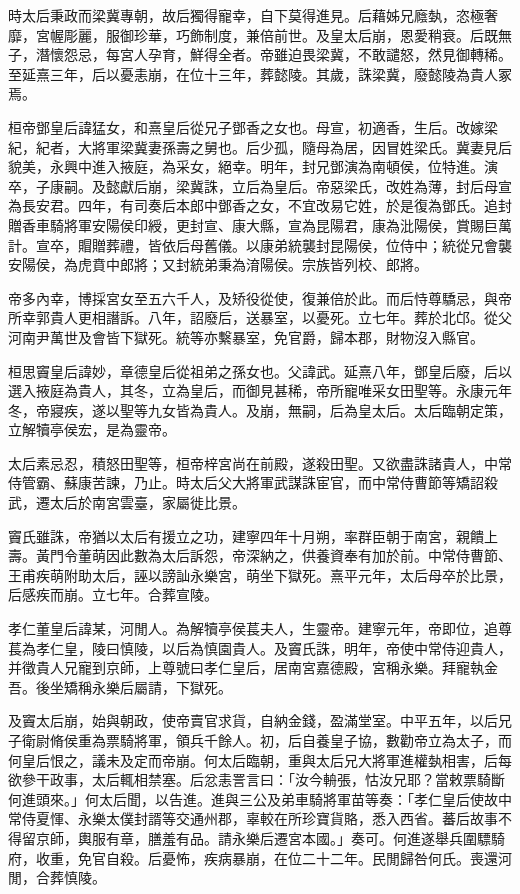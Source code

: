 \begin{pinyinscope}
時太后秉政而梁冀專朝，故后獨得寵幸，自下莫得進見。后藉姊兄廕埶，恣極奢靡，宮幄彫麗，服御珍華，巧飾制度，兼倍前世。及皇太后崩，恩愛稍衰。后既無子，潛懷怨忌，每宮人孕育，鮮得全者。帝雖迫畏梁冀，不敢譴怒，然見御轉稀。至延熹三年，后以憂恚崩，在位十三年，葬懿陵。其歲，誅梁冀，廢懿陵為貴人冢焉。

桓帝鄧皇后諱猛女，和熹皇后從兄子鄧香之女也。母宣，初適香，生后。改嫁梁紀，紀者，大將軍梁冀妻孫壽之舅也。后少孤，隨母為居，因冒姓梁氏。冀妻見后貌美，永興中進入掖庭，為采女，絕幸。明年，封兄鄧演為南頓侯，位特進。演卒，子康嗣。及懿獻后崩，梁冀誅，立后為皇后。帝惡梁氏，改姓為薄，封后母宣為長安君。四年，有司奏后本郎中鄧香之女，不宜改易它姓，於是復為鄧氏。追封贈香車騎將軍安陽侯印綬，更封宣、康大縣，宣為昆陽君，康為沘陽侯，賞賜巨萬計。宣卒，賵贈葬禮，皆依后母舊儀。以康弟統襲封昆陽侯，位侍中；統從兄會襲安陽侯，為虎賁中郎將；又封統弟秉為淯陽侯。宗族皆列校、郎將。

帝多內幸，博採宮女至五六千人，及矫役從使，復兼倍於此。而后恃尊驕忌，與帝所幸郭貴人更相譖訴。八年，詔廢后，送暴室，以憂死。立七年。葬於北邙。從父河南尹萬世及會皆下獄死。統等亦繫暴室，免官爵，歸本郡，財物沒入縣官。

桓思竇皇后諱妙，章德皇后從祖弟之孫女也。父諱武。延熹八年，鄧皇后廢，后以選入掖庭為貴人，其冬，立為皇后，而御見甚稀，帝所寵唯采女田聖等。永康元年冬，帝寢疾，遂以聖等九女皆為貴人。及崩，無嗣，后為皇太后。太后臨朝定策，立解犢亭侯宏，是為靈帝。

太后素忌忍，積怒田聖等，桓帝梓宮尚在前殿，遂殺田聖。又欲盡誅諸貴人，中常侍管霸、蘇康苦諫，乃止。時太后父大將軍武謀誅宦官，而中常侍曹節等矯詔殺武，遷太后於南宮雲臺，家屬徙比景。

竇氏雖誅，帝猶以太后有援立之功，建寧四年十月朔，率群臣朝于南宮，親饋上壽。黃門令董萌因此數為太后訴怨，帝深納之，供養資奉有加於前。中常侍曹節、王甫疾萌附助太后，誣以謗訕永樂宮，萌坐下獄死。熹平元年，太后母卒於比景，后感疾而崩。立七年。合葬宣陵。

孝仁董皇后諱某，河閒人。為解犢亭侯萇夫人，生靈帝。建寧元年，帝即位，追尊萇為孝仁皇，陵曰慎陵，以后為慎園貴人。及竇氏誅，明年，帝使中常侍迎貴人，并徵貴人兄寵到京師，上尊號曰孝仁皇后，居南宮嘉德殿，宮稱永樂。拜寵執金吾。後坐矯稱永樂后屬請，下獄死。

及竇太后崩，始與朝政，使帝賣官求貨，自納金錢，盈滿堂室。中平五年，以后兄子衛尉脩侯重為票騎將軍，領兵千餘人。初，后自養皇子協，數勸帝立為太子，而何皇后恨之，議未及定而帝崩。何太后臨朝，重與太后兄大將軍進權埶相害，后每欲參干政事，太后輒相禁塞。后忿恚詈言曰：「汝今輈張，怙汝兄耶？當敕票騎斷何進頭來。」何太后聞，以告進。進與三公及弟車騎將軍苗等奏：「孝仁皇后使故中常侍夏惲、永樂太僕封諝等交通州郡，辜較在所珍寶貨賂，悉入西省。蕃后故事不得留京師，輿服有章，膳羞有品。請永樂后遷宮本國。」奏可。何進遂舉兵圍驃騎府，收重，免官自殺。后憂怖，疾病暴崩，在位二十二年。民閒歸咎何氏。喪還河閒，合葬慎陵。


\end{pinyinscope}

